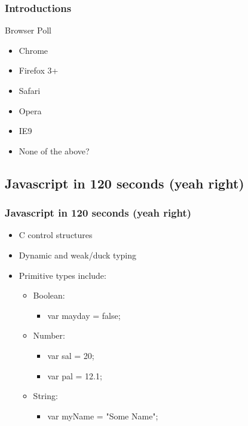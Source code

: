 \documentclass{beamer}
\begin{document}
\begin{frame}
    \frametitle{Introductions}
\pause
    \begin{block}{Browser Poll}
        \begin{itemize}
\pause
        \item Chrome
\pause
        \item Firefox 3+
\pause
        \item Safari
\pause
        \item Opera
\pause        
        \item IE9
\pause
        \item None of the above?
        \end{itemize}
    \end{block}
\end{frame}


\subsection{Javascript in 120 seconds (yeah right)}


\begin{frame}
    \frametitle{Javascript in 120 seconds (yeah right)}
    \begin{itemize}
    \item C control structures
    \item Dynamic and weak/duck typing
    \item Primitive types include:
        \begin{itemize}
        \item Boolean: 
            \begin{itemize}
            \item var mayday = false;
            \end{itemize}
        \item Number: 
            \begin{itemize}
            \item var sal = 20; 
            \item var pal = 12.1;
            \end{itemize}
        \item String: 
            \begin{itemize}
            \item var myName = "Some Name";
            \end{itemize}
        \end{itemize}
    \end{itemize}
\end{frame}
\end{document}
